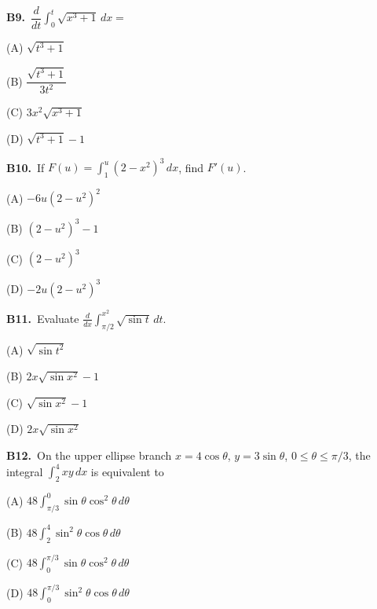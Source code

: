 \documentclass[11pt]{article}
\begin{document}
\bigskip\noindent\textbf{B9.}\ $\displaystyle\dfrac{d}{dt}\int_{0}^{t} \sqrt{x^3+1}\,dx =$
\begin{list}{}{\setlength{\leftmargin}{3em}\setlength{\labelwidth}{2.5em}\setlength{\itemsep}{0pt}\setlength{\topsep}{2pt}}
\item[(A)] $\sqrt{t^3+1}$
\item[(B)] $\dfrac{\sqrt{t^3+1}}{3t^2}$
\item[(C)] $3x^2\sqrt{x^3+1}$
\item[(D)] $\sqrt{t^3+1}-1$
\end{list}

\bigskip\noindent\textbf{B10.}\ If $F(u)=\int_1^u(2-x^2)^3\,dx$, find $F\prime(u)$.
\begin{list}{}{\setlength{\leftmargin}{3em}\setlength{\labelwidth}{2.5em}\setlength{\itemsep}{0pt}\setlength{\topsep}{2pt}}
\item[(A)] $-6u(2-u^2)^2$
\item[(B)] $(2-u^2)^3-1$
\item[(C)] $(2-u^2)^3$
\item[(D)] $-2u(2-u^2)^3$
\end{list}

\bigskip\noindent\textbf{B11.}\ Evaluate $\frac{d}{dx}\int_{\pi/2}^{x^2}\sqrt{\sin t}\,dt$.
\begin{list}{}{\setlength{\leftmargin}{3em}\setlength{\labelwidth}{2.5em}\setlength{\itemsep}{0pt}\setlength{\topsep}{2pt}}
\item[(A)] $\sqrt{\sin t^2}$
\item[(B)] $2x\sqrt{\sin x^2}-1$
\item[(C)] $\sqrt{\sin x^2}-1$
\item[(D)] $2x\sqrt{\sin x^2}$
\end{list}

\bigskip\noindent\textbf{B12.}\ On the upper ellipse branch $x=4\cos\theta$, $y=3\sin\theta$, $0\leq\theta\leq\pi/3$, the integral $\int_2^4xy\,dx$ is equivalent to
\begin{list}{}{\setlength{\leftmargin}{3em}\setlength{\labelwidth}{2.5em}\setlength{\itemsep}{0pt}\setlength{\topsep}{2pt}}
\item[(A)] $48\int_{\pi/3}^0\sin\theta\cos^2\theta\,d\theta$
\item[(B)] $48\int_2^4\sin^2\theta\cos\theta\,d\theta$
\item[(C)] $48\int_0^{\pi/3}\sin\theta\cos^2\theta\,d\theta$
\item[(D)] $48\int_0^{\pi/3}\sin^2\theta\cos\theta\,d\theta$
\end{list}
\end{document}
